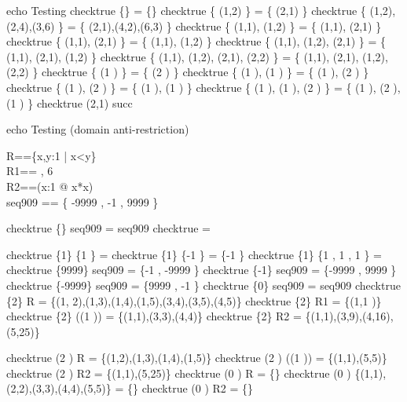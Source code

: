 echo     Testing \inv
checktrue \{\} \inv = \{\}
checktrue \{ (1,2) \} \inv = \{ (2,1) \}
checktrue \{ (1,2),(2,4),(3,6) \} \inv = \{ (2,1),(4,2),(6,3) \}
checktrue \{ (1,1), (1,2) \} \inv = \{ (1,1), (2,1) \}
checktrue \{ (1,1), (2,1) \} \inv = \{ (1,1), (1,2) \}
checktrue \{ (1,1), (1,2), (2,1) \} \inv = \{ (1,1), (2,1), (1,2) \}
checktrue \{ (1,1), (1,2), (2,1), (2,2) \} \inv = \{ (1,1), (2,1), (1,2), (2,2) \}
checktrue \{ (1 ) \} \inv = \{ (2 ) \}
checktrue \{ (1 ), (1 ) \} \inv = \{ (1 ), (2 ) \}
checktrue \{ (1 ), (2 ) \} \inv = \{ (1 ), (1 ) \}
checktrue \{ (1 ), (1 ), (2 ) \} \inv = \{ (1 ), (2 ), (1 ) \}
checktrue (2,1) \in succ\inv

echo     Testing \ndres (domain anti-restriction)
\begin{zed}
  R==\{x,y:1  | x<y\} \\
  R1== , 6  \rangle\\
  R2==(\lambda x:1  @ x*x)\\
  seq909 == \{ -9999 , -1 , 9999  \}
\end{zed}

checktrue \{\} \ndres seq909 = seq909
checktrue \emptyset \ndres \emptyset = \emptyset

checktrue \{1\} \ndres \{1 \} = \emptyset
checktrue \{1\} \ndres \{-1 \} = \{-1 \}
checktrue \{1\} \ndres \{1 , 1 , 1 \} = \emptyset
checktrue \{9999\} \ndres seq909 = \{-1 , -9999 \}
checktrue \{-1\} \ndres seq909 = \{-9999 , 9999 \}
checktrue \{-9999\} \ndres seq909 = \{9999 , -1 \}
checktrue \{0\} \ndres seq909 = seq909
checktrue \{2\} \ndres R = \{(1, 2),(1,3),(1,4),(1,5),(3,4),(3,5),(4,5)\}
checktrue \{2\} \ndres R1 = \{(1,1 )\}
checktrue \{2\} \ndres (\id (1 )) = \{(1,1),(3,3),(4,4)\}
checktrue \{2\} \ndres R2 = \{(1,1),(3,9),(4,16),(5,25)\}

checktrue (2 ) \ndres R = \{(1,2),(1,3),(1,4),(1,5)\}
checktrue (2 ) \ndres (\id (1 )) = \{(1,1),(5,5)\}
checktrue (2 ) \ndres R2 = \{(1,1),(5,25)\}
checktrue (0 ) \ndres R = \{\}
checktrue (0 ) \ndres \{(1,1),(2,2),(3,3),(4,4),(5,5)\} = \{\}
checktrue (0 ) \ndres R2 = \{\}

